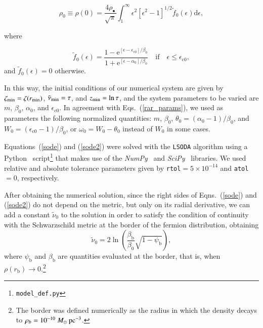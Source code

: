 \documentclass[twocolumn]{aa}
\begin{document}
\begin{appendix}
\begin{equation}
    \rho_0\equiv \rho(0) = \frac{4\rho_{\bullet}}{\sqrt{\pi}}\int^\infty_1\epsilon^2[\epsilon^2-1]^{1/2}\tilde{f}_0(\epsilon)\mathrm{d}\epsilon,
\end{equation}

where

\begin{equation}
\tilde{f}_0(\epsilon)=
      \frac{1-\mathrm {e}^{[\epsilon-\epsilon_\mathrm{c0}]/\beta_0}}
      {1+\mathrm {e}^{[\epsilon-\alpha_0]/\beta_0}}\quad\mathrm{if}\quad \epsilon \leq \epsilon_\mathrm{c0},
\end{equation}
and $\tilde{f}_0(\epsilon)=0$ otherwise.

In this way, the initial conditions of our numerical system are given
by $\zeta_{\rm{min}}=\zeta(r_{\rm{min}})$,
$\tilde{\nu}_{\rm{min}}=\tau$, and $z_{\rm{min}}=\ln{\tau}$, and the system parameters to be varied are $m$, $\beta_0$, $\alpha_0$, and $\epsilon_{c0}$.
In agreement with Eqs.~(\ref{rar_params}), we used as parameters the following normalized quantities: $m$, $\beta_0$, $\theta_0=(\alpha_0-1)/\beta_0$, and $W_0=(\epsilon_{\mathrm{c}0}-1)/\beta_0$, or $\omega_0=W_0-\theta_0$ instead of $W_0$ in some cases.

Equations~(\ref{sode}) and (\ref{sode2}) were solved with the \texttt{LSODA} algorithm using
a {\sc Python}~\citep{van1995python} script\footnote{\texttt{model\_def.py}}
that makes use of the {\it NumPy}~\citep{harris2020array} and {\it SciPy}~\citep{2020SciPy-NMeth} libraries.  We used relative and absolute tolerance parameters given by \texttt{rtol}$=5\times10^{-14}$ and \texttt{atol}$=0$, respectively.

After obtaining the numerical solution, since the right sides of Eqns.~(\ref{sode}) and (\ref{sode2}) do not depend on the metric, but only on its radial derivative, we can add
a constant $\tilde{\nu}_0$ to the solution in order to satisfy the condition of continuity with the Schwarzschild metric at the border of the fermion distribution, obtaining
\begin{equation}
\tilde{\nu}_0 = 2\ln\left(\frac{\beta_\mathrm{b}}{\beta_0}\sqrt{1-\psi_\mathrm{b}}\right),
\end{equation}
where $\psi_\mathrm{b}$ and $\beta_\mathrm{b}$ are quantities evaluated at the border, that is, when
$\rho(r_\mathrm{b})\rightarrow 0$.\footnote{The border was defined numerically as the radius in which
the density decays to $\rho_b=10^{-10}~M_\odot~\rm{pc}^{-3}$.}


\end{appendix}
\end{document}
